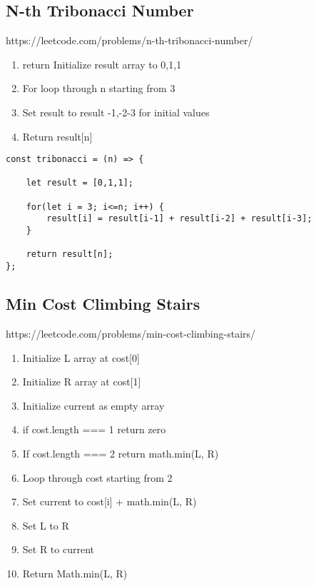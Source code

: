 \documentclass[10pt]{article}
\begin{document}
\medskip %






\pagebreak %
\medskip   
\subsection{N-th Tribonacci Number}
https://leetcode.com/problems/n-th-tribonacci-number/

\begin{enumerate}
	\item return Initialize result array to 0,1,1
	\item For loop through n starting from 3
	\item Set result to result -1,-2-3 for initial values
	\item Return result[n]
\end{enumerate}

\begin{lstlisting}[title=Solution tribonacci, captionpos=t]
const tribonacci = (n) => {
    
    let result = [0,1,1];
    
    for(let i = 3; i<=n; i++) {
        result[i] = result[i-1] + result[i-2] + result[i-3];
    }
    
    return result[n];
};
\end{lstlisting}

\medskip %






\pagebreak %
\medskip   
\subsection{Min Cost Climbing Stairs}
https://leetcode.com/problems/min-cost-climbing-stairs/

\begin{enumerate}
	\item Initialize L array at cost[0]
	\item Initialize R array at cost[1]
	\item Initialize current as empty array
	\item if cost.length === 1 return zero
	\item If cost.length === 2 return math.min(L, R)
	\item Loop through cost starting from 2
	\item Set current to cost[i] + math.min(L, R)
	\item Set L to R
	\item Set R to current
	\item Return Math.min(L, R)
\end{enumerate}
\end{document}
